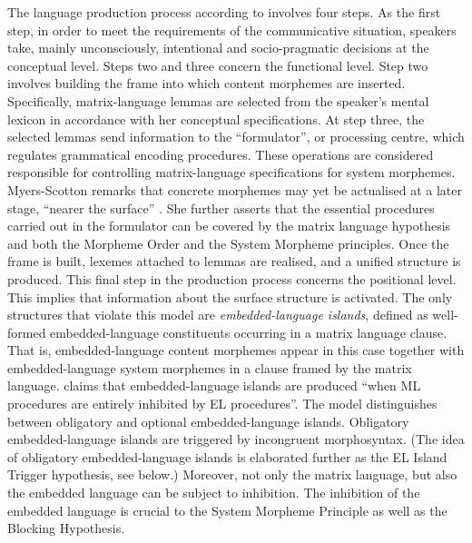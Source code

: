 The language production process according to \citet[116--119]{myers-scotton-duelling-1993} involves four steps. As the first step, in order to meet the requirements of the communicative situation, speakers take, mainly unconsciously, intentional and socio-pragmatic decisions at the conceptual level. Steps two and three concern the functional level. Step two involves building the frame into which content morphemes are inserted. Specifically, matrix-language lemmas are selected from the speaker's mental lexicon in accordance with her conceptual specifications. At step three, the selected lemmas send information to the ``formulator'', or processing centre, which regulates grammatical encoding procedures. These operations are considered responsible for controlling matrix-language specifications for system morphemes. Myers-Scotton remarks that concrete morphemes may yet be actualised at a later stage, ``nearer the surface'' \citep[][118]{myers-scotton-duelling-1993}. She further asserts that the essential procedures carried out in the formulator can be covered by the matrix language hypothesis and both the Morpheme Order and the System Morpheme principles. Once the frame is built, lexemes attached to lemmas are realised, and a unified structure is produced. This final step in the production process concerns the positional level. This implies that information about the surface structure is activated. The only structures that violate this model are \textit{embedded-language islands}, defined as well-formed embedded-language constituents occurring in a matrix language clause. That is, embedded-language content morphemes appear in this case together with embedded-language system morphemes in a clause framed by the matrix language. \citet[119]{myers-scotton-duelling-1993} claims that embedded-language islands are produced ``when ML procedures are entirely inhibited by EL procedures''. The model  distinguishes between obligatory and optional embedded-language islands. Obligatory embedded-language islands are triggered by incongruent morphosyntax. (The idea of obligatory em\-bed\-ded-lan\-guage islands is elaborated further as the EL Island Trigger hypothesis, see below.) Moreover, not only the matrix language, but also the embedded language can be subject to inhibition. The inhibition of the embedded language is crucial to the System Morpheme Principle as well as the Blocking Hypothesis.

